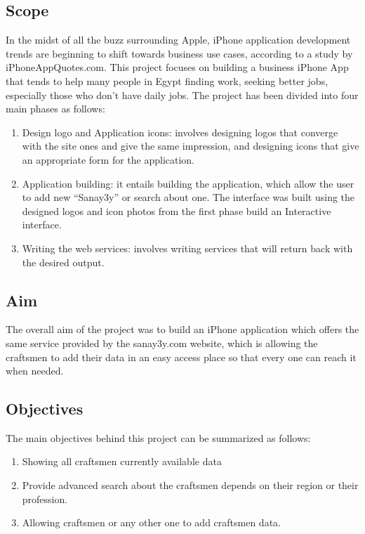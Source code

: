\documentclass[12pt,a4paper,final,twoside,onecolumn,titlepage]{book}
\begin{document}
\subsection{Scope}
In the midst of all the buzz surrounding Apple, iPhone application development trends are beginning to shift towards business use cases, according to a study by iPhoneAppQuotes.com. This project focuses on building a business iPhone App that tends to help many people in Egypt finding work, seeking better jobs, especially those who don't have daily jobs. The project has been divided into four main phases as follows:
\begin{enumerate}
\item Design logo and Application icons: involves designing logos that converge with the site ones and give the same impression, and designing icons that give an appropriate form for the application. 
\item Application building: it entails building the application, which allow the user to add new “Sanay3y” or search about one. The interface was built using the designed logos and icon photos from the first phase build an Interactive      interface.
\item Writing the web services: involves writing  services that will return back with the desired output.
\end{enumerate}

\subsection{Aim}
The overall aim of the project was to build an iPhone application which offers the same service provided by the sanay3y.com website, which is allowing the craftsmen to add their data in an easy access place so that every one can reach it when needed.

\subsection{Objectives}
The main objectives behind this project can be summarized as follows:
\begin{enumerate}
\item Showing all craftsmen currently available data 
\item Provide advanced search about the craftsmen depends on their region or their profession. 
\item Allowing craftsmen or any other one to add craftsmen data. 
\end{enumerate}
\end{document}
